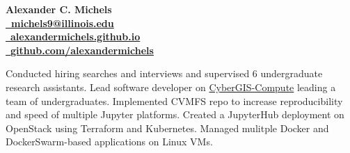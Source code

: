 \documentclass{acmresume}
\begin{document}
	
	\begin{multicols}{2}
		\vspace*{.1cm}
		\textbf{\huge Alexander C. Michels}\\ \columnbreak
        \hfill\href{mailto:michels9@illinois.edu}{\textbf{\faEnvelope~michels9@illinois.edu}} \\
        \hfill\href{http://alexandermichels.github.io}{\faGlobeAmericas~\textbf{alexandermichels.github.io}} \\
        \hfill\href{https://github.com/alexandermichels}{\faGithub~\textbf{github.com/alexandermichels}}
	\end{multicols}
	
	
		
		
	

	
        \begin{titemize}
            \titem Conducted hiring searches and interviews and supervised 6 undergraduate research assistants. 
            \titem Lead software developer on \href{https://github.com/cybergis/cybergis-compute-python-sdk}{CyberGIS-Compute} leading a team of undergraduates.
        	\titem Implemented CVMFS repo to increase reproducibility and speed of multiple Jupyter platforms.
            \titem Created a JupyterHub deployment on OpenStack using Terraform and Kubernetes.
            \titem Managed mulitple Docker and DockerSwarm-based applications on Linux  VMs.
        \end{titemize}

        \begin{titemize}
        \end{titemize}
		
\end{document}
